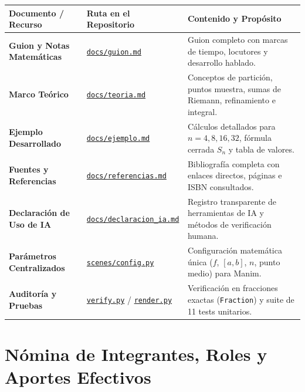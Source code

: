 \documentclass[10pt, a4paper]{article}
\begin{document}
\begin{tabularx}{\textwidth}{@{} p{4.5cm} p{4.1cm} Y @{}}
\toprule
\textbf{Documento / Recurso} & \textbf{Ruta en el Repositorio} & \textbf{Contenido y Propósito} \\
\midrule
\textbf{Guion y Notas Matemáticas} & \href{https://github.com/sofiarodrigueznog/EID-Grupo-3/blob/main/docs/guion.md}{\texttt{docs/guion.md}} & Guion completo con marcas de tiempo, locutores y desarrollo hablado. \\
\textbf{Marco Teórico} & \href{https://github.com/sofiarodrigueznog/EID-Grupo-3/blob/main/docs/teoria.md}{\texttt{docs/teoria.md}} & Conceptos de partición, puntos muestra, sumas de Riemann, refinamiento e integral. \\
\textbf{Ejemplo Desarrollado} & \href{https://github.com/sofiarodrigueznog/EID-Grupo-3/blob/main/docs/ejemplo.md}{\texttt{docs/ejemplo.md}} & Cálculos detallados para $n=4, 8, 16, 32$, fórmula cerrada $S_n$ y tabla de valores. \\
\textbf{Fuentes y Referencias} & \href{https://github.com/sofiarodrigueznog/EID-Grupo-3/blob/main/docs/referencias.md}{\texttt{docs/referencias.md}} & Bibliografía completa con enlaces directos, páginas e ISBN consultados. \\
\textbf{Declaración de Uso de IA} & \href{https://github.com/sofiarodrigueznog/EID-Grupo-3/blob/main/docs/declaracion_ia.md}{\texttt{docs/declaracion\_ia.md}} & Registro transparente de herramientas de IA y métodos de verificación humana. \\
\textbf{Parámetros Centralizados} & \href{https://github.com/sofiarodrigueznog/EID-Grupo-3/blob/main/scenes/config.py}{\texttt{scenes/config.py}} & Configuración matemática única ($f$, $[a,b]$, $n$, punto medio) para Manim. \\
\textbf{Auditoría y Pruebas} & \href{https://github.com/sofiarodrigueznog/EID-Grupo-3/blob/main/verify.py}{\texttt{verify.py}} / \href{https://github.com/sofiarodrigueznog/EID-Grupo-3/blob/main/render.py}{\texttt{render.py}} & Verificación en fracciones exactas (\texttt{Fraction}) y suite de 11 tests unitarios. \\
\bottomrule
\end{tabularx}

\section{Nómina de Integrantes, Roles y Aportes Efectivos}
\end{document}
